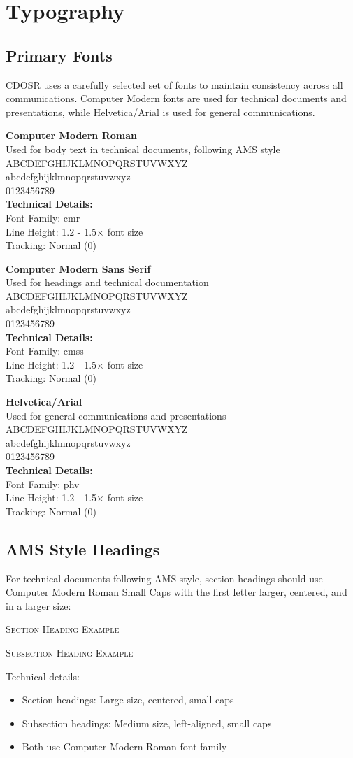 \documentclass[11pt]{article}
\newcommand{\fontsample}[3]{%
\begin{tcolorbox}[
  colback=white,
  colframe=CDOSRPrimary,
  width=0.95\linewidth,
  arc=2mm,
  boxrule=0.5pt
]
  \textbf{#1}\\
  #2\\
  \vspace{0.3cm}
  {\fontfamily{#3}\selectfont
  ABCDEFGHIJKLMNOPQRSTUVWXYZ\\
  abcdefghijklmnopqrstuvwxyz\\
  0123456789
  }\\
  \textbf{Technical Details:}\\
  Font Family: #3\\
  Line Height: 1.2 - 1.5× font size\\
  Tracking: Normal (0)
\end{tcolorbox}
}
\begin{document}
\section{Typography}

\subsection{Primary Fonts}

CDOSR uses a carefully selected set of fonts to maintain consistency across all communications. Computer Modern fonts are used for technical documents and presentations, while Helvetica/Arial is used for general communications.

\fontsample{Computer Modern Roman}{Used for body text in technical documents, following AMS style}{cmr}

\fontsample{Computer Modern Sans Serif}{Used for headings and technical documentation}{cmss}

\fontsample{Helvetica/Arial}{Used for general communications and presentations}{phv}

\subsection{AMS Style Headings}

For technical documents following AMS style, section headings should use Computer Modern Roman Small Caps with the first letter larger, centered, and in a larger size:

\begin{tcolorbox}[
  colback=white,
  colframe=CDOSRPrimary,
  width=0.95\linewidth,
  arc=2mm,
  boxrule=0.5pt
]
\begin{center}
    {\Large\scshape Section Heading Example}
\end{center}

\vspace{0.5cm}
\begin{center}
    {\large\scshape Subsection Heading Example}
\end{center}

\vspace{0.5cm}
Technical details:
\begin{itemize}[noitemsep]
    \item Section headings: Large size, centered, small caps
    \item Subsection headings: Medium size, left-aligned, small caps
    \item Both use Computer Modern Roman font family
\end{itemize}
\end{tcolorbox}
\end{document}
